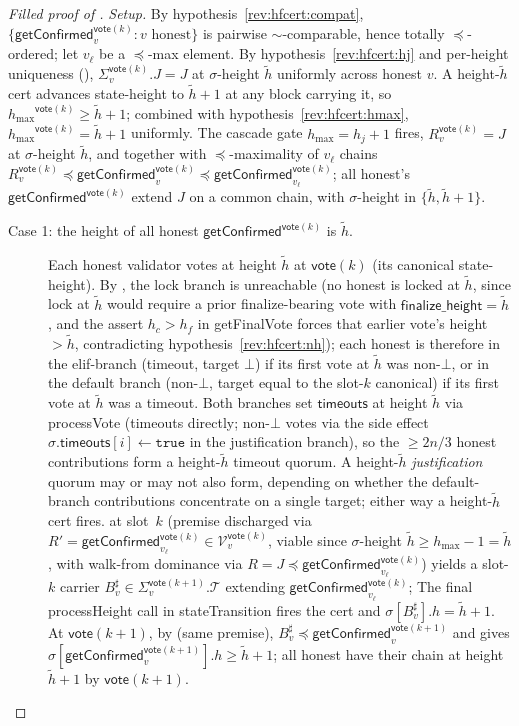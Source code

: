 \ifx\litemode\undefined\documentclass{article}\fi
\newcommand{\T}[0]{\ensuremath{\mathcal{T}}}
\newcommand{\V}[0]{\ensuremath{\mathcal{V}}}
\newcommand{\finalizeHeight}{\mathsf{finalize\_height}}
\newcommand{\timeouts}{\mathsf{timeouts}}
\newcommand{\hmax}{\ensuremath{h_{\max}}\xspace}
\newcommand{\stateTransition}{\textsf{stateTransition}\xspace}
\newcommand{\processHeight}{\textsf{processHeight}\xspace}
\newcommand{\processVote}{\textsf{processVote}\xspace}
\newcommand{\vote}{\ensuremath{\mathsf{vote}}}
\newcommand{\comm}[1]{\ensuremath{\widetilde{#1}}}
\newcommand{\getFinalVote}{\textsf{getFinalVote}\xspace}
\newcommand{\getConfirmed}{\textsf{getConfirmed}\xspace}
\theoremstyle{plain}
\theoremstyle{definition}
\theoremstyle{remark}
\begin{document}
\begin{proof}[Filled proof of ]
\emph{Setup.}
By hypothesis~\ref{rev:hfcert:compat}, $\{\getConfirmed_v^{\vote(k)} : v \text{ honest}\}$ is pairwise $\sim$-comparable, hence totally $\preceq$-ordered; let $v_\ell$ be a $\preceq$-max element.
By hypothesis~\ref{rev:hfcert:hj} and per-height uniqueness (), $\Sigma_v^{\vote(k)}.J = J$ at $\sigma$-height $\comm{h}$ uniformly across honest $v$.
A height-$\comm{h}$ cert advances state-height to $\comm{h}+1$ at any block carrying it, so $\hmax^{\vote(k)} \geq \comm{h}+1$;
combined with hypothesis~\ref{rev:hfcert:hmax}, $\hmax^{\vote(k)} = \comm{h}+1$ uniformly.
The cascade gate $\hmax = h_j+1$ fires, $R_v^{\vote(k)} = J$ at $\sigma$-height $\comm{h}$, and  together with $\preceq$-maximality of $v_\ell$ chains $R_v^{\vote(k)} \preceq \getConfirmed_v^{\vote(k)} \preceq \getConfirmed_{v_\ell}^{\vote(k)}$;
all honest's $\getConfirmed^{\vote(k)}$ extend $J$ on a common chain, with $\sigma$-height in $\{\comm{h}, \comm{h}+1\}$.

\begin{description}
  \item[Case 1: the height of all honest $\getConfirmed^{\vote(k)}$ is $\comm{h}$.]
  Each honest validator votes at height $\comm{h}$ at $\vote(k)$ (its canonical state-height).
  By , the lock branch is unreachable (no honest is locked at $\comm{h}$, since lock at $\comm{h}$ would require a prior finalize-bearing vote with $\finalizeHeight = \comm{h}$, and the assert $h_c > h_f$ in \getFinalVote{} forces that earlier vote's height $> \comm{h}$, contradicting hypothesis~\ref{rev:hfcert:nh});
  each honest is therefore in the elif-branch (timeout, target $\bot$) if its first vote at $\comm{h}$ was non-$\bot$, or in the default branch (non-$\bot$, target equal to the slot-$k$ canonical) if its first vote at $\comm{h}$ was a timeout.
  Both branches set $\timeouts$ at height $\comm{h}$ via \processVote{} (timeouts directly; non-$\bot$ votes via the side effect $\sigma.\timeouts[i] \gets \mathtt{true}$ in the justification branch), so the $\geq 2n/3$ honest contributions form a height-$\comm{h}$ timeout quorum.
  A height-$\comm{h}$ \emph{justification} quorum may or may not also form, depending on whether the default-branch contributions concentrate on a single target; either way a height-$\comm{h}$ cert fires.
   at slot~$k$ (premise discharged via $R' = \getConfirmed_{v_\ell}^{\vote(k)} \in \V_v^{\vote(k)}$, viable since $\sigma$-height $\comm{h} \geq \hmax-1 = \comm{h}$, with walk-from dominance via $R = J \preceq \getConfirmed_{v_\ell}^{\vote(k)}$) yields a slot-$k$ carrier $B^\sharp_v \in \Sigma_v^{\vote(k+1)}.\T$ extending $\getConfirmed_{v_\ell}^{\vote(k)}$;
  The final \processHeight{} call in \stateTransition{} fires the cert and $\sigma[B^\sharp_v].h = \comm{h}+1$.
  At $\vote(k+1)$, by  (same premise), $B^\sharp_v \preceq \getConfirmed_v^{\vote(k+1)}$ and  gives $\sigma[\getConfirmed_v^{\vote(k+1)}].h \geq \comm{h}+1$;
  all honest have their chain at height $\comm{h}+1$ by $\vote(k+1)$.


\end{description}
\end{proof}
\end{document}
